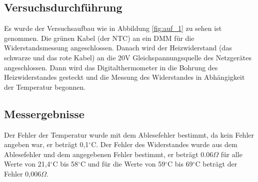 \documentclass[12pt,a4paper]{article}
\begin{document}
\subsection{Versuchsdurchführung}

Es wurde der Versuchsaufbau wie in Abbildung \ref{fig:auf_1} zu sehen ist genommen. Die grünen Kabel (der NTC) an ein DMM für die Widerstandsmessung angeschlossen. Danach wird der Heizwiderstand (das schwarze und das rote Kabel) an die 20V Gleichspannungsquelle des Netzgerätes angeschlossen. Dann wird das Digitalthermometer in die Bohrung des Heizwiderstandes gesteckt und die Messung des Widerstandes in Abhängigkeit der Temperatur begonnen.

\subsection{Messergebnisse}

Der Fehler der Temperatur wurde mit dem Ablesefehler bestimmt, da kein Fehler angeben war, er beträgt 0,1$^\circ$C. Der Fehler des Widerstandes wurde aus dem Ablesefehler und dem angegebenen Fehler bestimmt, er beträgt 0.06$\Omega$ für alle Werte von 21,4$^\circ$C bis 58$^\circ$C und für die Werte von 59$^\circ$C bis 69$^\circ$C beträgt der Fehler 0,006$\Omega$.
\end{document}
